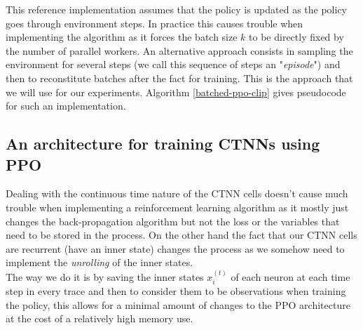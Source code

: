 This reference implementation assumes that the policy is updated as the policy goes through environment steps. In practice this causes trouble when implementing the algorithm as it forces the batch size $k$ to be directly fixed by the number of parallel workers. An alternative approach consists in sampling the environment for several steps (we call this sequence of steps an "\textit{episode}") and then to reconstitute batches after the fact for training. This is the approach that we will use for our experiments. Algorithm \ref{batched-ppo-clip} gives pseudocode for such an implementation.


\subsection{An architecture for training CTNNs using PPO}

Dealing with the continuous time nature of the CTNN cells doesn't cause much trouble when implementing a reinforcement learning algorithm as it mostly just changes the back-propagation algorithm but not the loss or the variables that need to be stored in the process. On the other hand the fact that our CTNN cells are recurrent (have an inner state) changes the process as we somehow need to implement the \textit{unrolling} of the inner states. \\

The way we do it is by saving the inner states $x_i^{(t)}$ of each neuron at each time step in every trace and then to consider them to be observations when training the policy, this allows for a minimal amount of changes to the PPO architecture at the cost of a relatively high memory use.